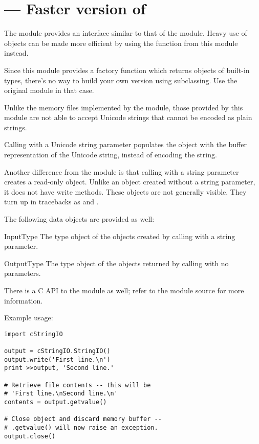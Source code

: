 \section{ ---
         Faster version of }


The module  provides an interface similar to that of
the  module.  Heavy use of 
objects can be made more efficient by using the function
 from this module instead.

Since this module provides a factory function which returns objects of
built-in types, there's no way to build your own version using
subclassing.  Use the original  module in that case.

Unlike the memory files implemented by the 
module, those provided by this module are not able to accept Unicode
strings that cannot be encoded as plain \ASCII{} strings.

Calling  with a Unicode string parameter populates
the object with the buffer representation of the Unicode string, instead of
encoding the string.

Another difference from the  module is that calling
 with a string parameter creates a read-only object.
Unlike an object created without a string parameter, it does not have
write methods.  These objects are not generally visible.  They turn up in
tracebacks as  and .

The following data objects are provided as well:


\begin{datadesc}{InputType}
  The type object of the objects created by calling
   with a string parameter.
\end{datadesc}

\begin{datadesc}{OutputType}
  The type object of the objects returned by calling
   with no parameters.
\end{datadesc}


There is a C API to the module as well; refer to the module source for 
more information.

Example usage:

\begin{verbatim}
import cStringIO

output = cStringIO.StringIO()
output.write('First line.\n')
print >>output, 'Second line.'

# Retrieve file contents -- this will be
# 'First line.\nSecond line.\n'
contents = output.getvalue()

# Close object and discard memory buffer -- 
# .getvalue() will now raise an exception.
output.close()
\end{verbatim}

